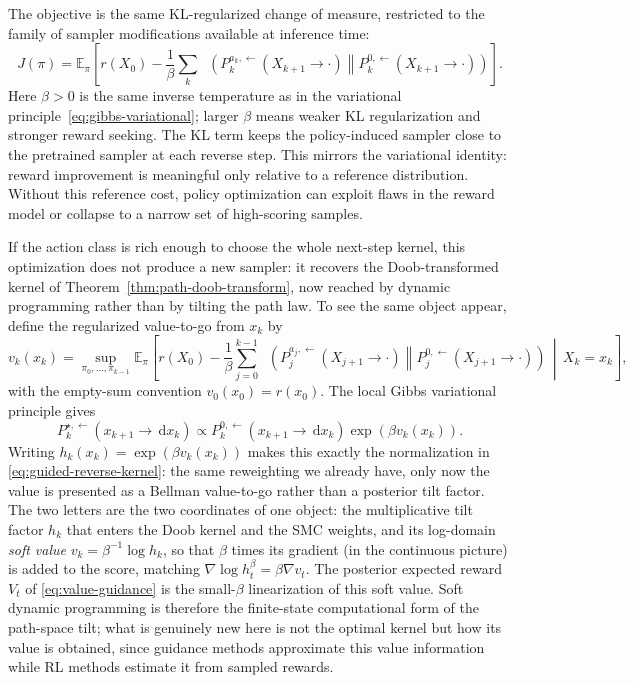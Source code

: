 \documentclass[10pt,a4paper]{amsart}
\numberwithin{equation}{section}
\DeclareMathOperator{\KL}{D_{\mathsf{KL}}}
\newcommand{\E}{\mathbb{E}}
\newcommand{\dd}{\,\mathrm{d}}
\begin{document}
The objective is the same KL-regularized change of measure, restricted to the
family of sampler modifications available at inference time:
\begin{equation}\label{eq:rl-kl-objective}
    J(\pi)
    =
    \E_{\pi}
    \left[
    r(X_0)
    -
    \frac1\beta\sum_k
    \KL\!\left(
    P_k^{a_k,\leftarrow}(X_{k+1}\to\cdot)
    \middle\|
    P_k^{0,\leftarrow}(X_{k+1}\to\cdot)
    \right)
    \right].
\end{equation}
Here $\beta>0$ is the same inverse temperature as in the variational
principle~\eqref{eq:gibbs-variational}; larger $\beta$ means weaker KL
regularization and stronger reward seeking.  The KL term keeps the
policy-induced sampler close to the pretrained sampler at each reverse step.
This mirrors the variational identity: reward improvement is meaningful only
relative to a reference distribution.  Without this reference cost, policy
optimization can exploit flaws in the reward model or collapse to a narrow set
of high-scoring samples.

If the action class is rich enough to choose the whole next-step kernel, this
optimization does not produce a new sampler: it recovers the Doob-transformed
kernel of Theorem~\ref{thm:path-doob-transform}, now reached by dynamic
programming rather than by tilting the path law.  To see the same object appear,
define the regularized value-to-go from $x_k$ by
\[
    v_k(x_k)
    =
    \sup_{\pi_0,\ldots,\pi_{k-1}}
    \E_{\pi}
    \left[
    r(X_0)
    -
    \frac1\beta\sum_{j=0}^{k-1}
    \KL\!\left(
    P_j^{a_j,\leftarrow}(X_{j+1}\to\cdot)
    \middle\|
    P_j^{0,\leftarrow}(X_{j+1}\to\cdot)
    \right)
    \,\middle|\, X_k=x_k
    \right],
\]
with the empty-sum convention $v_0(x_0)=r(x_0)$.  The local Gibbs variational
principle gives
\[
    P_k^{\star,\leftarrow}(x_{k+1}\to \dd x_k)
    \propto
    P_k^{0,\leftarrow}(x_{k+1}\to \dd x_k)
    \exp\left(\beta v_k(x_k)\right).
\]
Writing $h_k(x_k)=\exp(\beta v_k(x_k))$ makes this exactly the normalization
in \eqref{eq:guided-reverse-kernel}: the same reweighting we already have, only
now the value is presented as a Bellman value-to-go rather than a
posterior tilt factor.  The two letters are the two coordinates of one object:
the multiplicative tilt factor $h_k$ that enters the Doob kernel and the SMC
weights, and its log-domain \emph{soft value} $v_k=\beta^{-1}\log h_k$, so that
$\beta$ times its gradient (in the continuous picture) is added to the score,
matching $\nabla\log h_t^\beta=\beta\nabla v_t$.  The
posterior expected reward $V_t$ of \eqref{eq:value-guidance} is the small-$\beta$
linearization of this soft value.  Soft dynamic programming is therefore the finite-state
computational form of the path-space tilt; what is genuinely new here is not the
optimal kernel but how its value is obtained, since guidance methods approximate
this value information while RL methods estimate it from sampled rewards.
\end{document}
